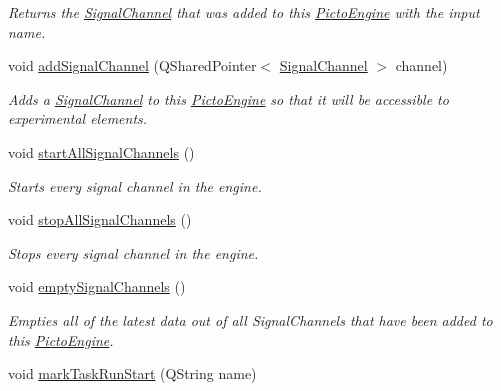 \begin{DoxyCompactItemize}
\begin{DoxyCompactList}\small\item\em Returns the \hyperlink{class_picto_1_1_signal_channel}{Signal\-Channel} that was added to this \hyperlink{class_picto_1_1_engine_1_1_picto_engine}{Picto\-Engine} with the input name. \end{DoxyCompactList}\item 
void \hyperlink{class_picto_1_1_engine_1_1_picto_engine_a56d9e7dd7be31239a3b457c24245211b}{add\-Signal\-Channel} (Q\-Shared\-Pointer$<$ \hyperlink{class_picto_1_1_signal_channel}{Signal\-Channel} $>$ channel)
\begin{DoxyCompactList}\small\item\em Adds a \hyperlink{class_picto_1_1_signal_channel}{Signal\-Channel} to this \hyperlink{class_picto_1_1_engine_1_1_picto_engine}{Picto\-Engine} so that it will be accessible to experimental elements. \end{DoxyCompactList}\item 
void \hyperlink{class_picto_1_1_engine_1_1_picto_engine_a7b055a0bc31c0d3cc99a175992dc57d8}{start\-All\-Signal\-Channels} ()
\begin{DoxyCompactList}\small\item\em Starts every signal channel in the engine. \end{DoxyCompactList}\item 
void \hyperlink{class_picto_1_1_engine_1_1_picto_engine_a801e4a9fbb82f80b13ead4c10967a962}{stop\-All\-Signal\-Channels} ()
\begin{DoxyCompactList}\small\item\em Stops every signal channel in the engine. \end{DoxyCompactList}\item 
\hypertarget{class_picto_1_1_engine_1_1_picto_engine_ab4819f116e44b987e402334fde8be727}{void \hyperlink{class_picto_1_1_engine_1_1_picto_engine_ab4819f116e44b987e402334fde8be727}{empty\-Signal\-Channels} ()}\label{class_picto_1_1_engine_1_1_picto_engine_ab4819f116e44b987e402334fde8be727}

\begin{DoxyCompactList}\small\item\em Empties all of the latest data out of all Signal\-Channels that have been added to this \hyperlink{class_picto_1_1_engine_1_1_picto_engine}{Picto\-Engine}. \end{DoxyCompactList}\item 
\hypertarget{class_picto_1_1_engine_1_1_picto_engine_a30baace93f3bce1f0a2afadfe67f89ac}{void \hyperlink{class_picto_1_1_engine_1_1_picto_engine_a30baace93f3bce1f0a2afadfe67f89ac}{mark\-Task\-Run\-Start} (Q\-String name)}\label{class_picto_1_1_engine_1_1_picto_engine_a30baace93f3bce1f0a2afadfe67f89ac}


\end{DoxyCompactItemize}
